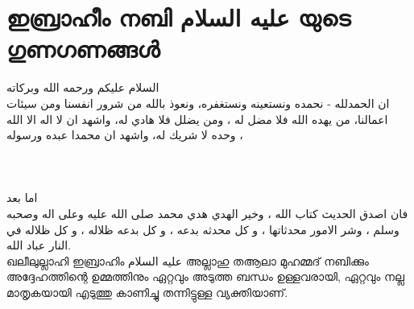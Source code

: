 \chapter{\textmalayalam{ഇബ്രാഹീം നബി} \textarabic{عليه السلام} \textmalayalam{യുടെ ഗുണഗണങ്ങൾ}}


{السلام عليكم ورحمه الله وبركاته} \\

%


 ان الحمدلله - نحمده ونستعينه ونستغفره، ونعوذ بالله من شرور انفسنا ومن سيئات اعمالنا، من يهده الله فلا مضل له ، ومن يضلل فلا هادي له، واشهد ان لا اله الا الله وحده لا شريك له، واشهد ان محمدا عبده ورسوله ، \\ 
 
 \quranayah[3][102] 
 ~ \\
  \quranayah[4][1] 
  ~ \\
    \quranayah[33][70] 
     \quranayah[33][71] 
    ~ \\
 اما بعد  \\ 
 
 فان اصدق الحديث كتاب الله ، وخير الهدي هدي محمد صلى الله عليه وعلى اله وصحبه وسلم ، وشر الامور محدثاتها ، و كل محدثه بدعه ، و كل بدعه ظلاله ، و كل ظلاله في النار عباد الله. \\ 
 
 
 
 ഖലീലുല്ലാഹി ഇബ്രാഹിം  \textarabic{عليه السلام} അല്ലാഹു തആലാ മുഹമ്മദ് നബിക്കും അദ്ദേഹത്തിന്റെ ഉമ്മത്തിനും ഏറ്റവും അടുത്ത ബന്ധം ഉള്ളവരായി,  ഏറ്റവും നല്ല മാതൃകയായി എടുത്തു കാണിച്ചു തന്നിട്ടുള്ള വ്യക്തിയാണ്. \\
 
